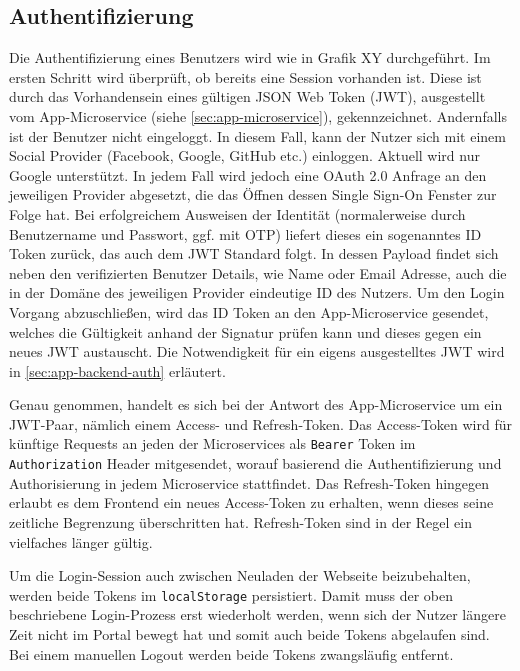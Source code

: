 \documentclass{article}
\begin{document}
\subsection{Authentifizierung}
\label{sec:frontend-auth}

Die Authentifizierung eines Benutzers wird wie in Grafik XY durchgeführt. Im ersten Schritt wird überprüft, ob bereits eine Session vorhanden ist. Diese ist durch das Vorhandensein eines gültigen JSON Web Token (JWT), ausgestellt vom 
App-Microservice (siehe \autoref{sec:app-microservice}), gekennzeichnet. Andernfalls ist der Benutzer nicht eingeloggt. In diesem Fall, kann der Nutzer sich mit einem Social Provider (Facebook, Google, GitHub etc.) einloggen. Aktuell wird nur Google unterstützt. In jedem Fall wird jedoch eine OAuth 2.0 Anfrage an den jeweiligen Provider abgesetzt, die das Öffnen dessen Single Sign-On Fenster zur Folge hat. Bei erfolgreichem Ausweisen der Identität (normalerweise durch Benutzername und Passwort, ggf. mit OTP) liefert dieses ein sogenanntes ID Token zurück, das auch dem JWT Standard folgt. In dessen Payload findet sich neben den verifizierten Benutzer Details, wie Name oder Email Adresse, auch die in der Domäne des jeweiligen Provider eindeutige ID des Nutzers. Um den Login Vorgang abzuschließen, wird das ID Token an den App-Microservice gesendet, welches die Gültigkeit anhand der Signatur prüfen kann und dieses gegen ein neues JWT austauscht. Die Notwendigkeit für ein eigens ausgestelltes JWT wird in \autoref{sec:app-backend-auth} erläutert.

Genau genommen, handelt es sich bei der Antwort des App-Microservice um ein JWT-Paar, nämlich einem Access- und Refresh-Token. Das Access-Token wird für künftige Requests an jeden der Microservices als \texttt{Bearer} Token im \texttt{Authorization} Header mitgesendet, worauf basierend die Authentifizierung und Authorisierung in jedem Microservice stattfindet. Das Refresh-Token hingegen erlaubt es dem Frontend ein neues Access-Token zu erhalten, wenn dieses seine zeitliche Begrenzung überschritten hat. Refresh-Token sind in der Regel ein vielfaches länger gültig.

Um die Login-Session auch zwischen Neuladen der Webseite beizubehalten, werden beide Tokens im \texttt{localStorage} persistiert. Damit muss der oben beschriebene Login-Prozess erst wiederholt werden, wenn sich der Nutzer längere Zeit nicht im Portal bewegt hat und somit auch beide Tokens abgelaufen sind. Bei einem manuellen Logout werden beide Tokens zwangsläufig entfernt. 
\end{document}
